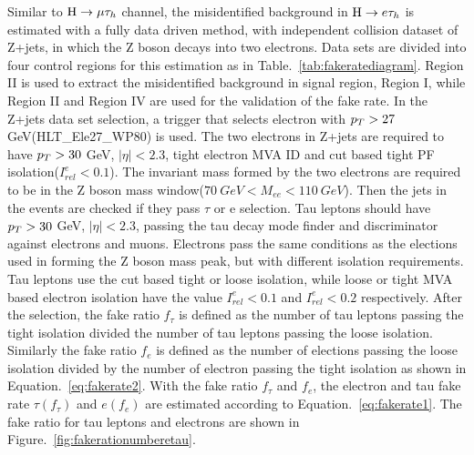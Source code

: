 Similar to $\mathrm{H}\to \mu\tau_{h}$ channel, the misidentified background in $\mathrm{H} \to e \tau_{h}$ is estimated with a fully data driven method, with independent collision dataset of Z+jets, in which the Z boson decays into two electrons.  Data sets are divided into four control regions for this estimation as in Table.~\ref{tab:fakeratediagram}. Region II is used to extract the misidentified background in signal region, Region I, while Region II and Region IV are used for the validation of the fake rate. In the Z+jets data set selection, a trigger that selects electron with $p_{T}>27$ GeV(HLT\_Ele27\_WP80) is used. The two electrons in Z+jets are required to have $p_{T}>30$ GeV, $|\eta|<2.3$, tight electron MVA ID and cut based tight PF isolation($I^{e}_{rel}<0.1$). The invariant mass formed by the two electrons are required to be in the Z boson mass window($70~GeV<M_{ee}<110~GeV$). Then the jets in the events are checked if they pass $\tau$ or e selection. Tau leptons should have $p_{T}>30$ GeV, $|\eta|<2.3$, passing the tau decay mode finder and discriminator against electrons and muons. Electrons pass the same conditions as the elections used in forming the Z boson mass peak, but with different isolation requirements. Tau leptons use the cut based tight or loose isolation, while loose or tight MVA based electron isolation have the value $I^{e}_{rel}<0.1$ and $I^{e}_{rel}<0.2$ respectively. After the selection, the fake ratio $f_{\tau}$ is defined as the number of tau leptons passing the tight isolation divided the number of tau leptons passing the loose isolation. Similarly the fake ratio $f_{e}$ is defined as the number of elections passing the loose isolation divided by the number of electron passing the tight isolation as shown in Equation.~\ref{eq:fakerate2}. With the fake ratio $f_{\tau}$ and  $f_{e}$, the electron and tau fake rate $\tau(f_{\tau})$ and $e(f_{e})$ are estimated according to Equation.~\ref{eq:fakerate1}. The fake ratio for tau leptons and electrons are shown in Figure.~\ref{fig:fakerationumberetau}. 


